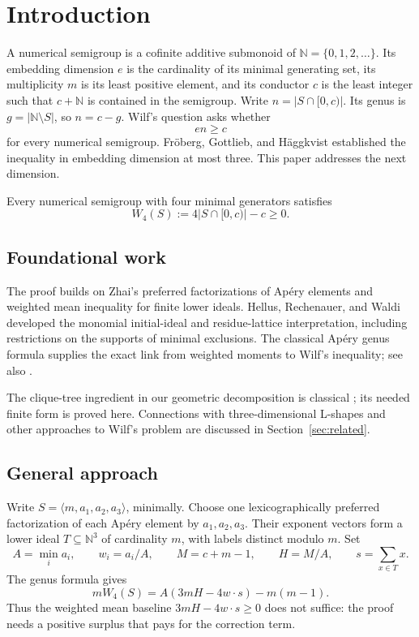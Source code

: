 \section{Introduction}\label{sec:introduction}

A numerical semigroup is a cofinite additive submonoid of
\(\mathbb N=\{0,1,2,\ldots\}\). Its embedding dimension \(e\) is the
cardinality of its minimal generating set, its multiplicity \(m\) is its
least positive element, and its conductor \(c\) is the least integer such
that \(c+\mathbb N\) is contained in the semigroup. Write
\(n=|S\cap[0,c)|\). Its genus is \(g=|\mathbb N\setminus S|\),
so \(n=c-g\). Wilf's question \cite{W} asks whether
\[
en\ge c
\]
for every numerical semigroup. Fr\"oberg, Gottlieb, and H\"aggkvist
\cite{FGH} established the inequality in embedding dimension at most
three. This paper addresses the next dimension.

\begin{theorem}\label{thm:main}
Every numerical semigroup with four minimal generators satisfies
\[
W_4(S):=4|S\cap[0,c)|-c\ge0.
\]
\end{theorem}

\subsection{Foundational work}

The proof builds on Zhai's \cite{Z} preferred factorizations of
Ap\'ery elements and weighted mean inequality for finite lower ideals.
Hellus, Rechenauer, and Waldi \cite{HRW} developed the monomial
initial-ideal and residue-lattice interpretation, including restrictions
on the supports of minimal exclusions. The classical Ap\'ery genus
formula supplies the exact link from
weighted moments to Wilf's inequality; see also \cite{Book}.

The clique-tree ingredient in our geometric decomposition is classical
\cite{G}; its needed finite form is proved here. Connections with
three-dimensional L-shapes \cite{L,C} and other approaches to Wilf's
problem are discussed in Section~\ref{sec:related}.

\subsection{General approach}

Write \(S=\langle m,a_1,a_2,a_3\rangle\), minimally. Choose one
lexicographically preferred factorization of each Ap\'ery element by
\(a_1,a_2,a_3\). Their exponent vectors form a lower ideal
\(T\subseteq\mathbb N^3\) of cardinality \(m\), with labels distinct
modulo \(m\). Set
\[
A=\min_i a_i,\qquad w_i=a_i/A,\qquad
M=c+m-1,\qquad H=M/A,\qquad s=\sum_{x\in T}x.
\]
The genus formula gives
\[
mW_4(S)=A(3mH-4w\cdot s)-m(m-1).
\]
Thus the weighted mean baseline \(3mH-4w\cdot s\ge0\) does not suffice:
the proof needs a positive surplus that pays for the correction term.

